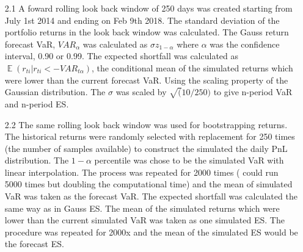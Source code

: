 \documentclass[a4paper,11pt]{article}
\DeclareMathOperator{\E}{\mathbb{E}}
\begin{document}
\begin{flushleft}
\begin{itemize}
\item[2.1] A foward rolling look back window of 250 days was created starting from July 1st 2014 and ending on Feb 9th 2018. The standard deviation of the portfolio returns in the look back window was calculated. The Gauss return forecast VaR, $VAR_{\alpha}$ was calculated as $\sigma z_{1-\alpha}$ where $\alpha$ was the confidence interval, 0.90 or 0.99. The expected shortfall was calculated as $\E\left(r_{ti} | r_{ti} < -VAR_{t\alpha}\right)$, the conditional mean of the simulated returns which were lower than the current forecast VaR. 
Using the scaling property of the Gaussian distribution. The $\sigma$ was scaled by $\sqrt(10/250)$ to give n-period VaR and n-period ES. 

\item[2.2] The same rolling look back window was used for bootstrapping returns. The historical returns were randomly selected with replacement for 250 times (the number of samples available) to construct the simulated the daily PnL distribution. The $1-\alpha$ percentile was chose to be the simulated VaR with linear interpolation. The process was repeated for 2000 times ( could run 5000 times but doubling the computational time)  and the mean of simulated VaR was taken as the forecast VaR. The expected shortfall was calculated the same way as in Gauss ES. The mean of the simulated returns which were lower than the current simulated VaR was taken as one simulated ES. The procedure was repeated for 2000x and the mean of the simulated ES would be the forecast ES.


\end{itemize}
\end{flushleft}
\end{document}
